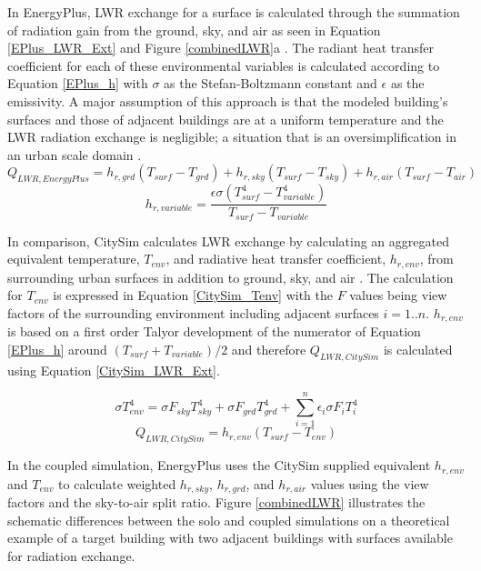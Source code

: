 \documentclass{tBPS2e}
\theoremstyle{plain}
\theoremstyle{definition}
\theoremstyle{remark}
\begin{document}
In EnergyPlus, LWR exchange for a surface is calculated through the summation
of radiation gain from the ground, sky, and air as seen in Equation
\ref{EPlus_LWR_Ext} and Figure \ref{combinedLWR}a \citep{doe2010energyplus}.
The radiant heat transfer coefficient for each of these environmental
variables is calculated according to Equation \ref{EPlus_h} with $\sigma$ as
the Stefan-Boltzmann constant and $\epsilon$ as the emissivity. A major
assumption of this approach is that the modeled building's surfaces and those
of adjacent buildings are at a uniform temperature and the LWR radiation
exchange is negligible; a situation that is an oversimplification in an urban
scale domain \citep{Evins:2014cf}.
\begin{equation} \label{EPlus_LWR_Ext} 
Q_{LWR,EnergyPlus} = h_{r,grd}(T_{surf}-T_{grd}) + h_{r,sky}(T_{surf}-T_{sky}) + h_{r,air}(T_{surf}-T_{air})
\end{equation}
\begin{equation} \label{EPlus_h} 
h_{r,variable} = \frac{\epsilon\sigma(T^{4}_{surf}-T^{4}_{variable})}{T_{surf}-T_{variable}}
\end{equation}

In comparison, CitySim calculates LWR exchange by calculating an aggregated
equivalent temperature, $T_{env}$, and radiative heat transfer coefficient,
$h_{r,env}$, from surrounding urban surfaces in addition to ground, sky, and
air \citep{Robinson:2009tm}. The calculation for $T_{env}$ is expressed in
Equation \ref{CitySim_Tenv} with the $F$ values being view factors of the
surrounding environment including adjacent surfaces $i=1..n$. $h_{r,env}$ is
based on a first order Talyor development of the numerator of Equation
\ref{EPlus_h} around $(T_{surf}+T_{variable})/2$ and therefore
$Q_{LWR,CitySim}$ is calculated using Equation \ref{CitySim_LWR_Ext}.

\begin{equation} \label{CitySim_Tenv} 
\sigma T_{env}^4 = \sigma F_{sky}T_{sky}^4 +\sigma F_{grd}T_{grd}^4 + \sum_{i=1}^{n} \epsilon_i \sigma F_{i}T_{i}^4
\end{equation}
\begin{equation} \label{CitySim_LWR_Ext} 
Q_{LWR,CitySim} = h_{r,env}(T_{surf}-T_{env})
\end{equation}

In the coupled simulation, EnergyPlus uses the CitySim supplied equivalent
$h_{r,env}$ and $T_{env}$ to calculate weighted $h_{r,sky}$, $h_{r,grd}$, and
$h_{r,air}$ values using the view factors and the sky-to-air split ratio.
Figure \ref{combinedLWR} illustrates the schematic differences between the
solo and coupled simulations on a theoretical example of a target building
with two adjacent buildings with surfaces available for radiation exchange.
\end{document}
